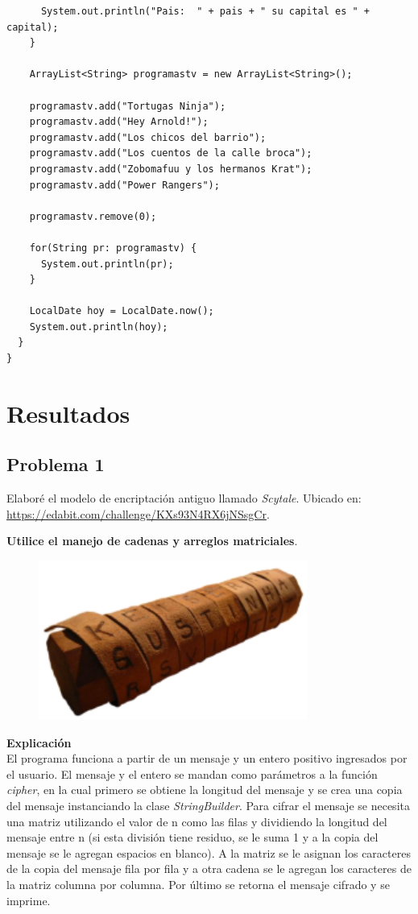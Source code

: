 \documentclass[11pt, twocolumn]{article}
\begin{document}
\begin{lstlisting}
      System.out.println("Pais:  " + pais + " su capital es " + capital);
    }

    ArrayList<String> programastv = new ArrayList<String>();

    programastv.add("Tortugas Ninja");
    programastv.add("Hey Arnold!");
    programastv.add("Los chicos del barrio");
    programastv.add("Los cuentos de la calle broca");
    programastv.add("Zobomafuu y los hermanos Krat");
    programastv.add("Power Rangers");

    programastv.remove(0);

    for(String pr: programastv) {
      System.out.println(pr);
    }

    LocalDate hoy = LocalDate.now();
    System.out.println(hoy);
  }
}
  \end{lstlisting} 

  \section*{Resultados}
  \subsection*{Problema 1}
  Elaboré el modelo de encriptación antiguo llamado \textit{Scytale}. Ubicado en: \url{https://edabit.com/challenge/KXs93N4RX6jNSsgCr}. 
  
  \textbf{Utilice el manejo de cadenas y arreglos matriciales}.

  \begin{figure}[ht]
    \includegraphics[width=0.5\columnwidth, center]{Scytale.png}
  \end{figure}

  \textbf{Explicación} \\
  El programa funciona a partir de un mensaje y un entero positivo ingresados por el usuario. El mensaje y el entero se mandan como parámetros a la función \textit{cipher}, en la cual primero se obtiene la longitud del mensaje y se crea una copia del mensaje instanciando la clase \textit{StringBuilder}. Para cifrar el mensaje se necesita una matriz utilizando el valor de n como las filas y dividiendo la longitud del mensaje entre n (si esta división tiene residuo, se le suma 1 y a la copia del mensaje se le agregan espacios en blanco). A la matriz se le asignan los caracteres de la copia del mensaje fila por fila y a otra cadena se le agregan los caracteres de la matriz columna por columna. Por último se retorna el mensaje cifrado y se imprime.
\end{document}
